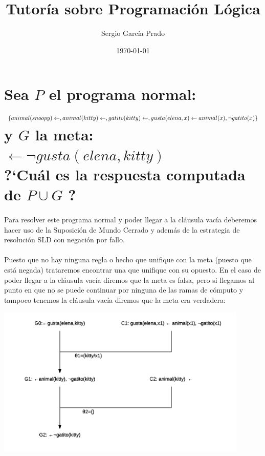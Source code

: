 \documentclass[11pt, a4paper,spanish]{article}
\title{\vspace{-15mm}\fontsize{24.88pt}{10pt}\textbf{Tutoría sobre Programación Lógica}} %
\author{Sergio García Prado}
\date{\today}
\begin{document}
	\maketitle %

	\thispagestyle{fancy} %


	\section{Sea $P$ el programa normal: \\
		$\{animal(snoopy) \gets, \\
		animal(kitty) \gets, \\
		gatito(kitty) \gets, \\
		gusta(elena,x) \gets animal(x), \neg gatito(x)\}\\$
		y $G$ la meta: \\
		$\gets \neg gusta(elena,kitty)$\\
		?`Cuál es la respuesta computada de $P \cup {G}$ ?}

		\paragraph{}
		Para resolver este programa normal y poder llegar a la cláusula vacía deberemos hacer uso de la Suposición de Mundo Cerrado y además de la estrategia de resolución SLD con negación por fallo.

		\paragraph{}
		Puesto que no hay ninguna regla o hecho que unifique con la meta (puesto que está negada) trataremos encontrar una que unifique con su opuesto. En el caso de poder llegar a la cláusula vacía diremos que la meta es falsa, pero si llegamos al punto en que no se puede continuar por ninguna de las ramas de cómputo y tampoco tenemos la cláusula vacía diremos que la meta era verdadera:

		\includegraphics[width=0.9\textwidth]{sldnf-computation-1}
\end{document}

